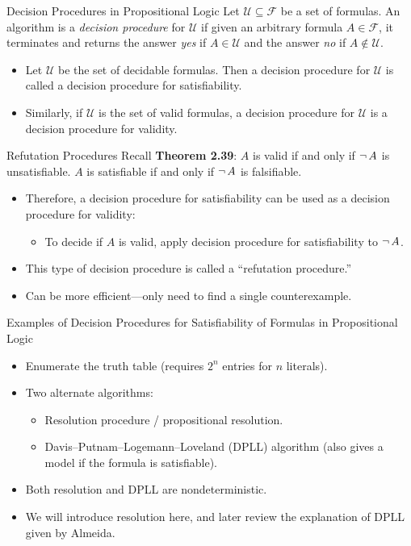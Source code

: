 \documentclass[style=sailor,size=12pt]{powerdot}
\theoremstyle{definition}
\newenvironment{defn}[1]
  {\renewcommand\theinnerdefn{#1}\innerdefn}
  {\endinnerdefn}
\begin{document}
\begin{wideslide}[bm=,toc=]{Decision Procedures in Propositional Logic}
\begin{defn}{2.40}[Ben Ari]
Let $\mathcal{U} \subseteq \mathcal{F}$ be a set of formulas. An algorithm
is a \emph{decision procedure} for $\mathcal{U}$ if given an arbitrary formula
$A \in \mathcal{F}$, it terminates and returns the answer \emph{yes} if
$A \in \mathcal{U}$ and the answer \emph{no} if $A \notin \mathcal{U}$.
\end{defn}
\begin{itemize}
\item Let $\mathcal{U}$ be the set of decidable formulas. Then a decision
procedure for $\mathcal{U}$ is called a decision procedure for satisfiability.
\item Similarly, if $\mathcal{U}$ is the set of valid formulas, a decision
procedure for $\mathcal{U}$ is a decision procedure for validity. 
\end{itemize} 
\end{wideslide}

\begin{wideslide}[bm=,toc=]{Refutation Procedures}
Recall \textbf{Theorem 2.39}: $A$ is valid if and only if $\mathop{\neg} A$ is unsatisfiable.
$A$ is satisfiable if and only if $\mathop{\neg} A$ is falsifiable.
\begin{itemize}
\item Therefore, a decision procedure for satisfiability can be used as a
decision procedure for validity: 
\begin{itemize}
\item To decide if $A$ is valid, apply decision procedure for satisfiability to $\mathop{\neg} A$. 
\end{itemize} 
\item This type of decision procedure is called a ``refutation procedure.'' 
\item Can be more efficient---only need to find a single counterexample.
\end{itemize} 
\end{wideslide}

\begin{wideslide}[bm=,toc=]{Examples of Decision Procedures for Satisfiability
  of Formulas in Propositional Logic}
\begin{itemize}
\item Enumerate the truth table (requires $2^n$ entries for $n$ literals).
\item Two alternate algorithms:
\begin{itemize}
\item Resolution procedure / propositional resolution.
\item Davis--Putnam--Logemann--Loveland (DPLL) algorithm (also gives a model if
    the formula is satisfiable).
\end{itemize} 
\item Both resolution and DPLL are nondeterministic. 
\item We will introduce resolution here, and later review the explanation of DPLL
given by Almeida.
\end{itemize} 

\end{wideslide}
\end{document}
